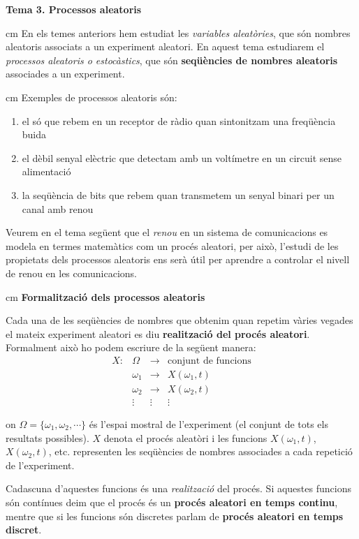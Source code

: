 \documentclass{article}
\begin{document}
\textbf{\Large Tema 3. Processos aleatoris}

 cm
En els temes anteriors hem estudiat les \textit{variables aleat\`ories}, que s\'on
nombres aleatoris associats a un experiment aleatori. En aquest tema estudiarem
el \textit{processos aleatoris o estoc\`astics}, que s\'on \textbf{seq\"u\`encies de nombres aleatoris}
associades a un experiment.

 cm
Exemples de processos aleatoris s\'on:
\begin{enumerate}
\item el s\'o que rebem en un receptor de r\`adio quan sintonitzam una freq\"u\`encia buida
\item el d\`ebil senyal el\`ectric que detectam amb un volt\'imetre en un circuit sense
alimentaci\'o
\item la seq\"u\`encia de bits que rebem quan transmetem un senyal binari per un canal amb renou
\end{enumerate}

Veurem en el tema seg\"uent que el \textit{renou} en un sistema de comunicacions
es modela en termes matem\`atics com un 
proc\'es aleatori, per aix\`o, l'estudi de les propietats dels processos aleatoris ens
ser\`a \'util per aprendre a controlar el nivell de renou en les comunicacions.

 cm
\textbf{Formalitzaci\'o dels processos aleatoris}

Cada una de les seq\"u\`encies de nombres que obtenim quan repetim v\`aries vegades
el mateix experiment aleatori es diu \textbf{realitzaci\'o del proc\'es aleatori}.
Formalment aix\`o ho podem escriure de la seg\"uent manera:
\[
\begin{array}{rccc}
X: & \Omega & \longrightarrow  & \text{conjunt de funcions}\\
   & \omega_1 & \rightarrow & X(\omega_1, t) \\
   & \omega_2 & \rightarrow & X(\omega_2, t) \\
   & \vdots   & \vdots      &   \vdots 
\end{array}
\]

\noindent
on $\Omega=\{ \omega_1, \omega_2, \cdots \}$ \'es l'espai mostral de l'experiment (el conjunt
de tots els resultats possibles). $X$ denota el proc\'es aleat\`ori i les funcions 
$X(\omega_1, t)$, $X(\omega_2, t)$, etc. representen
les seq\"u\`encies de nombres associades a cada repetici\'o de l'experiment.

Cadascuna d'aquestes funcions \'es una \textit{realitzaci\'o} del proc\'es.
Si aquestes funcions s\'on cont\'inues deim que el proc\'es \'es un 
\textbf{proc\'es aleatori en temps continu}, mentre que si les funcions s\'on discretes
parlam de \textbf{proc\'es aleatori en temps discret}. 
\end{document}
